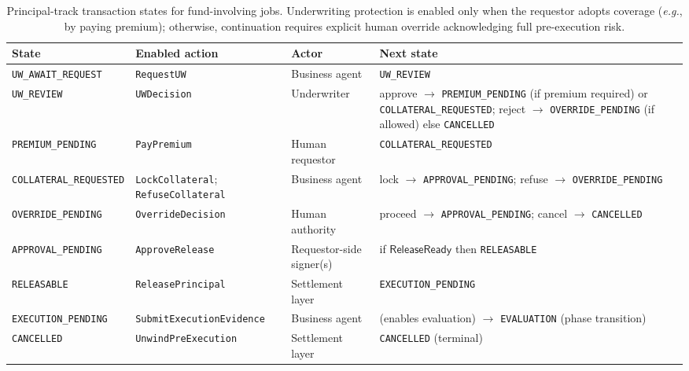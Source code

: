 \documentclass{article} %
\begin{document}
\begin{table}[!ht]
\centering
\small
\setlength{\tabcolsep}{5pt}
\renewcommand{\arraystretch}{1.2}
\begin{tabular}{p{3.3cm}p{3.15cm}p{2.8cm}p{4.3cm}}
\hline
\textbf{State} & \textbf{Enabled action} & \textbf{Actor} & \textbf{Next state} \\
\hline
\texttt{UW\_AWAIT\_REQUEST} &
\texttt{RequestUW} &
Business agent &
\texttt{UW\_REVIEW} \\
\texttt{UW\_REVIEW} &
\texttt{UWDecision} &
Underwriter &
approve $\rightarrow$ \texttt{PREMIUM\_PENDING} (if premium required) or \texttt{COLLATERAL\_REQUESTED};\newline
reject $\rightarrow$ \texttt{OVERRIDE\_PENDING} (if allowed) else \texttt{CANCELLED} \\
\texttt{PREMIUM\_PENDING} &
\texttt{PayPremium} &
Human requestor &
\texttt{COLLATERAL\_REQUESTED} \\
\texttt{COLLATERAL\_REQUESTED} &
\texttt{LockCollateral}; \texttt{RefuseCollateral} &
Business agent &
lock $\rightarrow$ \texttt{APPROVAL\_PENDING};\newline
refuse $\rightarrow$ \texttt{OVERRIDE\_PENDING} \\
\texttt{OVERRIDE\_PENDING} &
\texttt{OverrideDecision} &
Human authority &
proceed $\rightarrow$ \texttt{APPROVAL\_PENDING};\newline
cancel $\rightarrow$ \texttt{CANCELLED} \\
\texttt{APPROVAL\_PENDING} &
\texttt{ApproveRelease} &
Requestor-side signer(s) &
if $\mathsf{ReleaseReady}$ then \texttt{RELEASABLE} \\
\texttt{RELEASABLE} &
\texttt{ReleasePrincipal} &
Settlement layer &
\texttt{EXECUTION\_PENDING} \\
\texttt{EXECUTION\_PENDING} &
\scriptsize\texttt{SubmitExecutionEvidence} &
Business agent &
(enables evaluation) $\rightarrow$ \texttt{EVALUATION} (phase transition) \\
\texttt{CANCELLED} &
\texttt{UnwindPreExecution} &
Settlement layer &
\texttt{CANCELLED} (terminal) \\
\hline
\end{tabular}
\caption{Principal-track transaction states for fund-involving jobs. Underwriting protection is enabled only when the requestor adopts coverage (\emph{e.g.}, by paying premium); otherwise, continuation requires explicit human override acknowledging full pre-execution risk.}
\label{tab:ARS-principal-states}
\end{table}
\end{document}
